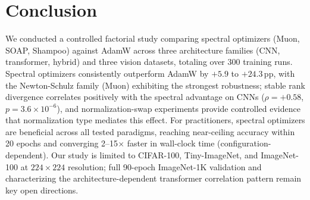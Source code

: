 \vspace{-1.0em}
\section{Conclusion}
\label{sec:conclusion}
\vspace{-0.3em}

We conducted a controlled factorial study comparing spectral optimizers (Muon, SOAP, Shampoo) against AdamW across three architecture families (CNN, transformer, hybrid) and three vision datasets, totaling over 300 training runs.
Spectral optimizers consistently outperform AdamW by $+5.9$ to $+24.3$\,pp, with the Newton-Schulz family (Muon) exhibiting the strongest robustness; stable rank divergence correlates positively with the spectral advantage on CNNs ($\rho{=}{+}0.58$, $p = 3.6 \times 10^{-6}$), and normalization-swap experiments provide controlled evidence that normalization type mediates this effect.
For practitioners, spectral optimizers are beneficial across all tested paradigms, reaching near-ceiling accuracy within 20 epochs and converging 2--15$\times$ faster in wall-clock time (configuration-dependent).
Our study is limited to CIFAR-100, Tiny-ImageNet, and ImageNet-100 at $224{\times}224$ resolution; full 90-epoch ImageNet-1K validation and characterizing the architecture-dependent transformer correlation pattern remain key open directions.
